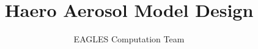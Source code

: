 \documentclass{book}
\theoremstyle{definition}
\theoremstyle{remark}
\begin{document}
\title{Haero Aerosol Model Design}
\author{EAGLES Computation Team}
\maketitle








\appendix




\listoftheorems[ignoreall, show={assume,appx}, onlynamed]
\nocite{*}

\end{document}
